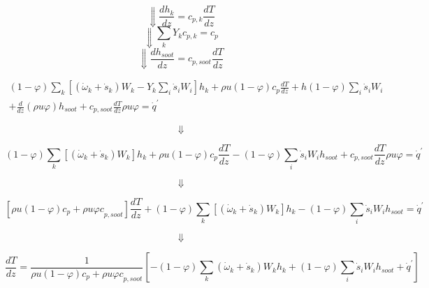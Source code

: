 \begin{equation*}
	\Downarrow \frac{dh_k}{dz} = c_{p,k} \frac{dT}{dz}
\end{equation*}
\begin{equation*}
	\Downarrow \sum_{k} Y_k c_{p,k} = c_p
\end{equation*}
\begin{equation*}
	\Downarrow \frac{dh_{soot}}{dz} = c_{p,soot} \frac{dT}{dz}
\end{equation*}

\begin{equation*}
	\begin{split}
	\left(1-\varphi\right)\sum_{k}{\left[({\dot{\omega}}_k+{\dot{s}}_k)W_k-Y_k\sum_{i}{{\dot{s}}_iW_i}\right]h_k}+\rho u
	\left(1-\varphi\right)
	c_{p}\frac{dT}{dz}
	+ h(1-\varphi)\sum_{i}{{\dot{s}}_iW_i}
	\\
	+
	\frac{d}{dz}\left(\rho u\varphi\right)h_{soot}+c_{p,soot}\frac{dT}{dz}\rho u\varphi={\dot{q}}^\prime
	\end{split}
\end{equation*}

\begin{equation*}
	\Downarrow
\end{equation*}

\begin{equation*}
	\left(1-\varphi\right)\sum_{k}{\left[({\dot{\omega}}_k+{\dot{s}}_k)W_k\right]h_k}
	+
	\rho u\left(1-\varphi\right)c_p\frac{dT}{dz}-(1-\varphi)\sum_{i}{{\dot{s}}_iW_i}h_{soot}+c_{p,soot}\frac{dT}{dz}\rho u\varphi={\dot{q}}^\prime
\end{equation*}

\begin{equation*}
	\Downarrow
\end{equation*}


\begin{equation*}
	\left[\rho u\left(1-\varphi\right){c}_p+{\rho u\varphi c}_{p,soot}\right]\frac{dT}{dz}+\left(1-\varphi\right)\sum_{k}{\left[({\dot{\omega}}_k+{\dot{s}}_k)W_k\right]h_k}-(1-\varphi)\sum_{i}{{\dot{s}}_iW_i}h_{soot}={\dot{q}}^\prime
\end{equation*}

\begin{equation*}
	\Downarrow
\end{equation*}


\begin{equation*}
	\frac{dT}{dz}=\frac{1}{\rho u\left(1-\varphi\right){c}_p+{\rho u\varphi c}_{p,soot}}\left[-\left(1-\varphi\right)\sum_{k}{\left({\dot{\omega}}_k+{\dot{s}}_k\right)W_kh_k}+\left(1-\varphi\right)\sum_{i}{{\dot{s}}_iW_i}h_{soot}+{\dot{q}}^\prime\right]
\end{equation*}
